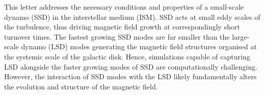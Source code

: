 \documentclass[preprint2]{aastex63}
\begin{document}

 This letter addresses the necessary conditions and properties of a small-scale
 dynamo (SSD) in the interstellar medium (ISM).
 SSD acts at small eddy scales of the turbulence, thus driving magnetic field
 growth at correspondingly short turnover times.
 The fastest growing SSD modes are far smaller than
the large-scale dynamo (LSD) modes generating the magnetic
field structures organised at the systemic scale of the galactic disk.
 Hence, simulations capable of capturing LSD alongside the faster growing modes
 of SSD are computationally challenging.
 However, the interaction of SSD modes with the LSD likely fundamentally alters
 the evolution and structure of the magnetic field.
\end{document}
